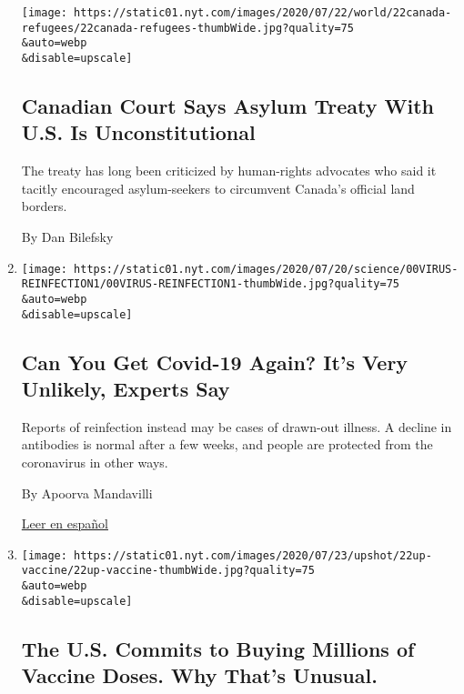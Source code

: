 \begin{enumerate}
  \texttt{[image: https://static01.nyt.com/images/2020/07/22/world/22canada-refugees/22canada-refugees-thumbWide.jpg?quality=75\\\&auto=webp\\\&disable=upscale]}

  \hypertarget{canadian-court-says-asylum-treaty-with-us-is-unconstitutional}{%
  \subsection{Canadian Court Says Asylum Treaty With U.S. Is
  Unconstitutional}\label{canadian-court-says-asylum-treaty-with-us-is-unconstitutional}}

  The treaty has long been criticized by human-rights advocates who said
  it tacitly encouraged asylum-seekers to circumvent Canada's official
  land borders.

  By Dan Bilefsky
\item
  \href{/2020/07/22/health/covid-antibodies-herd-immunity.html}{}

  \texttt{[image: https://static01.nyt.com/images/2020/07/20/science/00VIRUS-REINFECTION1/00VIRUS-REINFECTION1-thumbWide.jpg?quality=75\\\&auto=webp\\\&disable=upscale]}

  \hypertarget{can-you-get-covid-19-again-its-very-unlikely-experts-say}{%
  \subsection{Can You Get Covid-19 Again? It's Very Unlikely, Experts
  Say}\label{can-you-get-covid-19-again-its-very-unlikely-experts-say}}

  Reports of reinfection instead may be cases of drawn-out illness. A
  decline in antibodies is normal after a few weeks, and people are
  protected from the coronavirus in other ways.

  By Apoorva Mandavilli

  \href{https://www.nytimes.com/es/2020/07/24/espanol/ciencia-y-tecnologia/reinfeccion-coronavirus.html}{Leer
  en español}
\item
  \href{/2020/07/22/upshot/vaccine-coronavirus-government-purchase.html}{}

  \texttt{[image: https://static01.nyt.com/images/2020/07/23/upshot/22up-vaccine/22up-vaccine-thumbWide.jpg?quality=75\\\&auto=webp\\\&disable=upscale]}

  \hypertarget{the-us-commits-to-buying-millions-of-vaccine-doses-why-thats-unusual}{%
  \subsection{The U.S. Commits to Buying Millions of Vaccine Doses. Why
  That's
  Unusual.}\label{the-us-commits-to-buying-millions-of-vaccine-doses-why-thats-unusual}}


\end{enumerate}
